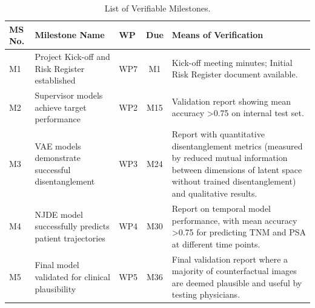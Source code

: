 \documentclass[11pt, a4paper]{article}
\begin{document}
\begin{table}[H]
    \centering
    \caption{List of Verifiable Milestones.}
    \label{tab:milestones}
    \small
    \begin{tabular}{lp{5.5cm}lcp{5cm}}
        \toprule
        \textbf{MS No.} & \textbf{Milestone Name} & \textbf{WP} & \textbf{Due} & \textbf{Means of Verification} \\
        \midrule
        M1 & Project Kick-off and Risk Register established & WP7 & M1 & Kick-off meeting minutes; Initial Risk Register document available. \\
        M2 & Supervisor models achieve target performance & WP2 & M15 & Validation report showing mean accuracy >0.75 on internal test set. \\
        M3 & VAE models demonstrate successful disentanglement & WP3 & M24 & Report with quantitative disentanglement metrics (measured by reduced mutual information between dimensions of latent space without trained disentanglement) and qualitative results. \\
        M4 & NJDE model successfully predicts patient trajectories & WP4 & M30 & Report on temporal model performance, with mean accuracy >0.75 for predicting TNM and PSA at different time points. \\
        M5 & Final model validated for clinical plausibility & WP5 & M36 & Final validation report where a majority of counterfactual images are deemed plausible and useful by testing physicians. \\
        \bottomrule
    \end{tabular}
\end{table}
\end{document}
